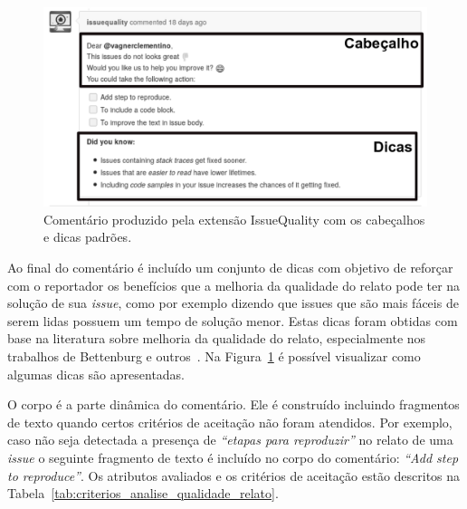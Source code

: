 \begin{figure}[htpb]
    \centering
    \includegraphics[width=0.8\linewidth]{chapter-implementacao-extensoes-fgrm/img/issue_original.png}
    \caption{Comentário produzido pela extensão IssueQuality com os cabeçalhos e
        dicas padrões.}
\label{fig:issue_original}
\end{figure}

Ao final do comentário é incluído um conjunto de dicas com objetivo de reforçar
com o reportador os benefícios que a melhoria da qualidade do relato pode ter na
solução de sua \textit{issue}, como por exemplo dizendo que issues que são mais
fáceis de serem lidas possuem um tempo de solução menor. Estas dicas foram
obtidas com base na literatura sobre melhoria da qualidade do relato,
especialmente nos trabalhos de Bettenburg e outros~\cite{bettenburg2007quality,
    bettenburg2008makes}. Na Figura~\ref{fig:issue_original} é possível
visualizar como algumas dicas são apresentadas.

O corpo é a parte dinâmica do comentário. Ele é construído incluindo fragmentos
de texto quando certos critérios de aceitação não foram atendidos.  Por exemplo,
caso não seja detectada a presença de \textit{``etapas para reproduzir''} no
relato de uma \textit{issue} o seguinte fragmento de texto é incluído no corpo
do comentário: \textit{``Add step to reproduce''}. Os atributos avaliados e os
critérios de aceitação estão descritos na
Tabela~\ref{tab:criterios_analise_qualidade_relato}.

